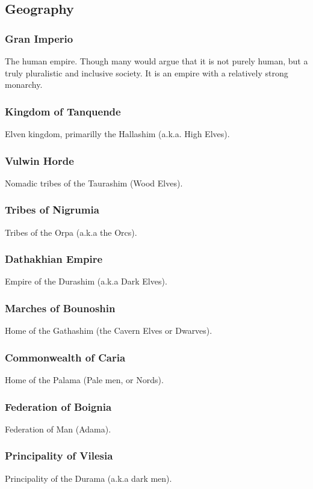 \documentclass[11pt]{article}
\begin{document}
\subsection{Geography}
\label{sec:orgc4adbab}
\subsubsection{Gran Imperio}
\label{sec:org4d4c865}
The human empire. Though many would argue that it is not purely human, but a truly pluralistic and inclusive society. It is an empire with a relatively strong monarchy.
\subsubsection{Kingdom of Tanquende}
\label{sec:orga341245}
Elven kingdom, primarilly the Hallashim (a.k.a. High Elves).
\subsubsection{Vulwin Horde}
\label{sec:orgb21887b}
Nomadic tribes of the Taurashim (Wood Elves).
\subsubsection{Tribes of Nigrumia}
\label{sec:org2f402c0}
Tribes of the Orpa (a.k.a the Orcs).
\subsubsection{Dathakhian Empire}
\label{sec:org821d896}
Empire of the Durashim (a.k.a Dark Elves).
\subsubsection{Marches of Bounoshin}
\label{sec:org8ab7aca}
Home of the Gathashim (the Cavern Elves or Dwarves).
\subsubsection{Commonwealth of Caria}
\label{sec:org6c5be6a}
Home of the Palama (Pale men, or Nords).
\subsubsection{Federation of Boignia}
\label{sec:orgc9d4954}
Federation of Man (Adama).
\subsubsection{Principality of Vilesia}
\label{sec:orge166004}
Principality of the Durama (a.k.a dark men).
\end{document}
